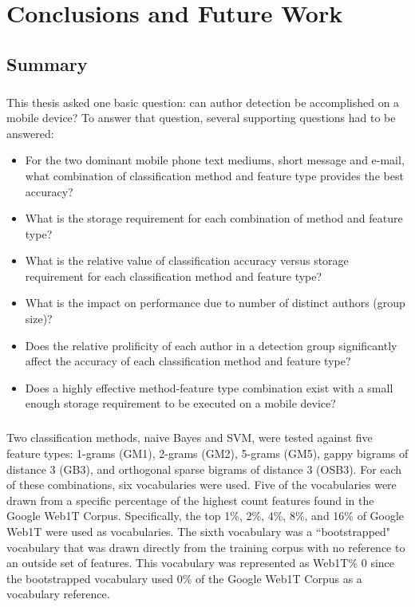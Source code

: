 \chapter{Conclusions and Future Work}

\section{Summary}
\paragraph*{} This thesis asked one basic question: can author detection be accomplished on a mobile device?  To answer that question, several supporting questions had to be answered: 
\begin{itemize}
	\item For the two dominant mobile phone text mediums, short message and e-mail, what combination of classification method and feature type provides the best accuracy?
	\item What is the storage requirement for each combination of method and feature type?
	\item What is the relative value of classification accuracy versus storage requirement for each classification method and feature type?
	\item What is the impact on performance due to number of distinct authors (group size)?
	\item Does the relative prolificity of each author in a detection group significantly affect the accuracy of each classification method and feature type?
	\item Does a highly effective method-feature type combination exist with a small enough storage requirement to be executed on a mobile device?
\end{itemize}

	\paragraph*{} Two classification methods, naive Bayes and SVM, were tested against five feature types: 1-grams (GM1), 2-grams (GM2), 5-grams (GM5), gappy bigrams of distance 3 (GB3), and orthogonal sparse bigrams of distance 3 (OSB3).  For each of these combinations, six vocabularies were used.  Five of the vocabularies were drawn from a specific percentage of the highest count features found in the Google Web1T Corpus.  Specifically, the top 1\%, 2\%, 4\%, 8\%, and 16\% of Google Web1T were used as vocabularies.  The sixth vocabulary was a ``bootstrapped" vocabulary that was drawn directly from the training corpus with no reference to an outside set of features.  This vocabulary was represented as Web1T\% 0 since the bootstrapped vocabulary used 0\% of the Google Web1T Corpus as a vocabulary reference.

